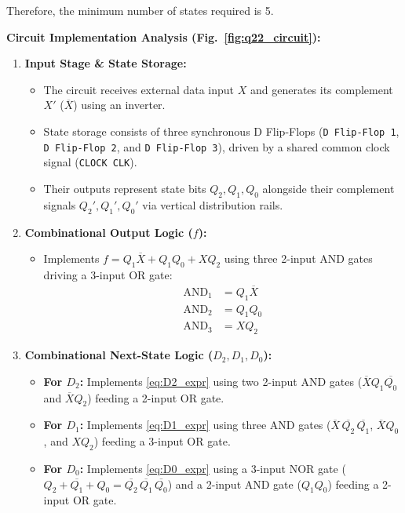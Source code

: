 \begin{enumerate}[label=\thesubsection.\arabic*, ref=\thesubsection.\theenumi]
Therefore, the minimum number of states required is 5.

\vspace{0.3cm}
\textbf{Circuit Implementation Analysis (Fig.~\ref{fig:q22_circuit}):}
\begin{enumerate}
    \item \textbf{Input Stage \& State Storage:} 
    \begin{itemize}
        \item The circuit receives external data input $X$ and generates its complement $X'$ ($\overline{X}$) using an inverter.
        \item State storage consists of three synchronous D Flip-Flops (\texttt{D Flip-Flop 1}, \texttt{D Flip-Flop 2}, and \texttt{D Flip-Flop 3}), driven by a shared common clock signal (\texttt{CLOCK CLK}).
        \item Their outputs represent state bits $Q_2, Q_1, Q_0$ alongside their complement signals $Q_2', Q_1', Q_0'$ via vertical distribution rails.
    \end{itemize}

    \item \textbf{Combinational Output Logic ($f$):}
    \begin{itemize}
        \item Implements $f = Q_1 \overline{X} + Q_1 Q_0 + X Q_2$ using three 2-input AND gates driving a 3-input OR gate:
        \begin{align}
        \text{AND}_1 &= Q_1 \overline{X} \\
        \text{AND}_2 &= Q_1 Q_0 \\
        \text{AND}_3 &= X Q_2
        \end{align}
    \end{itemize}

    \item \textbf{Combinational Next-State Logic ($D_2, D_1, D_0$):}
    \begin{itemize}
        \item \textbf{For $D_2$:} Implements \eqref{eq:D2_expr} using two 2-input AND gates ($\overline{X} Q_1 \overline{Q_0}$ and $\overline{X} Q_2$) feeding a 2-input OR gate.
        \item \textbf{For $D_1$:} Implements \eqref{eq:D1_expr} using three AND gates ($\overline{X} \,\overline{Q_2}\,\overline{Q_1}$, $\overline{X} Q_0$, and $X Q_2$) feeding a 3-input OR gate.
        \item \textbf{For $D_0$:} Implements \eqref{eq:D0_expr} using a 3-input NOR gate ($\overline{Q_2 + Q_1 + Q_0} = \overline{Q_2}\,\overline{Q_1}\,\overline{Q_0}$) and a 2-input AND gate ($Q_1 Q_0$) feeding a 2-input OR gate.
    \end{itemize}
\end{enumerate}


\end{enumerate}
